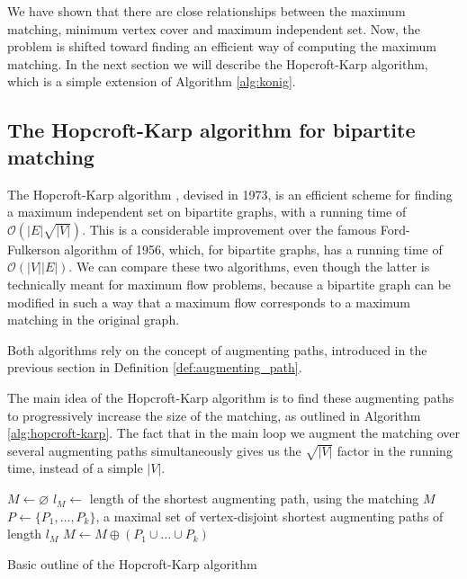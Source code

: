 We have shown that there are close relationships between the maximum matching, minimum vertex cover and maximum independent set. Now, the problem is shifted toward finding an efficient way of computing the maximum matching. In the next section we will describe the Hopcroft-Karp algorithm, which is a simple extension of Algorithm \ref{alg:konig}.

\subsection{The Hopcroft-Karp algorithm for bipartite matching} \label{sec:hopcroft_karp}

The Hopcroft-Karp algorithm \cite{hopcroft_karp}, devised in 1973, is an efficient scheme for finding a maximum independent set on bipartite graphs, with a running time of $\mathcal{O}\left( |E|\sqrt{|V|} \right)$. This is a considerable improvement over the famous Ford-Fulkerson algorithm of 1956, which, for bipartite graphs, has a running time of $\mathcal{O}\left( |V||E| \right)$. We can compare these two algorithms, even though the latter is technically meant for maximum flow problems, because a bipartite graph can be modified in such a way that a maximum flow corresponds to a maximum matching in the original graph.

Both algorithms rely on the concept of augmenting paths, introduced in the previous section in Definition \ref{def:augmenting_path}.

The main idea of the Hopcroft-Karp algorithm is to find these augmenting paths to progressively increase the size of the matching, as outlined in Algorithm \ref{alg:hopcroft-karp}. The fact that in the main loop we augment the matching over several augmenting paths simultaneously gives us the $\sqrt{|V|}$ factor in the running time, instead of a simple $|V|$.

\begin{algorithm}[h]
	\begin{algorithmic}
		\State $M \gets \varnothing$
		\Repeat
		\State $l_M \gets$ length of the shortest augmenting path, using the matching $M$
		\State $P \gets \{ P_1,\dots,P_k \}$, a maximal set of vertex-disjoint shortest augmenting paths of length $l_M$
		\State $M \gets M \oplus (P_1 \cup \dots \cup P_k )$
	\end{algorithmic}
	\caption{Basic outline of the Hopcroft-Karp algorithm} \label{alg:hopcroft-karp}
\end{algorithm}

